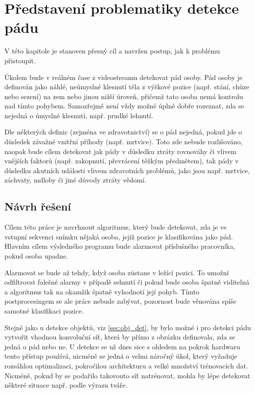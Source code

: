 \chapter{Představení problematiky detekce pádu}
\label{chap:Goal}

V této kapitole je stanoven přesný cíl a navržen postup, jak k problému
přistoupit.

Úkolem bude v reálném čase z videostreamu detekovat pád osoby. Pád osoby
je definován jako náhlé, neúmyslné klesnutí těla z výškové pozice (např. stání,
chůze nebo sezení) na zem nebo jinou nižší úroveň, přičemž tato osoba nemá
kontrolu nad tímto pohybem. Samozřejmě není vždy možné úplně dobře
rozeznat, zda se nejedná o úmyslné klesnutí, např. prudké lehnutí.

Dle některých definic (zejména ve zdravotnictví) se o pád nejedná, pokud jde o
důsledek závažné vnitřní příhody (např. mrtvice). Toto zde nebude rozlišováno,
naopak bude cílem detekovat jak pády v důsledku ztráty rovnováhy či vlivem
vnějších faktorů (např. zakopnutí, převrácení těžkým předmětem), tak pády v
důsledku akutních události vlivem zdravotních problémů, jako jsou např.
mrtvice, záchvaty, mdloby či jiné důvody ztráty vědomí.

\section{Návrh řešení}

Cílem této práce je navrhnout algoritmus, který bude detekovat, zda je ve
vstupní sekvenci snímku nějaká osoba, jejíž pozice je klasifikována jako pád.
Hlavním cílem výsledného programu bude alarmovat příslušného pracovníka, pokud
osoba upadne.

Alarmovat se bude až tehdy, když osoba zůstane v ležící pozici. To umožní
odfiltrovat falešné alarmy v případě sehnutí či pokud bude osoba špatně
viditelná a algoritmus tak na okamžik špatně vyhodnotí její pohyb. Tímto
postprocesingem se ale práce nebude zabývat, pozornost bude věnována spíše
samotné klasifikaci pozice.

Stejně jako u detekce objektů, viz \ref{sec:obj_det}, by bylo možné i pro
detekci pádu vytvořit vhodnou konvoluční síť, která by přímo z obrázku
definovala, zda se jedná o pád nebo ne. U detekce se už dnes sice s ohledem na
pokrok hardwaru tento přístup používá, nicméně se jedná o velmi náročný úkol,
který vyžaduje rozsáhlou optimalizaci, pokročilou architekturu a velké množství
trénovacích dat. Nicméně, pokud by se podařilo takovouto síť natrénovat, mohla
by lépe detekovat některé situace např. podle výrazu tváře.

